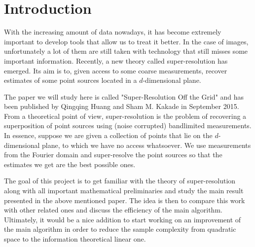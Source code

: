 \chapter{Introduction}
With the increasing amount of data nowadays, it has become extremely important to develop tools that allow us to treat it better. In the case of images, unfortunately a lot of them are still taken with technology that still misses some important information. Recently, a new theory called super-resolution has emerged. Its aim is to, given access to some coarse measurements, recover estimates of some point sources located in a $d$-dimensional plane.\par 

The paper we will study here is called "Super-Resolution Off the Grid" and has been published by Qingqing Huang and Sham M. Kakade in September 2015. From a theoretical point of view, super-resolution is the problem of recovering a superposition of point sources using (noise corrupted) bandlimited measurements. In essence, suppose we are given a collection of points that lie on the $d$-dimensional plane, to which we have no access whatsoever. We use measurements from the Fourier domain and super-resolve the point sources so that the estimates we get are the best possible ones.\par 

The goal of this project is to get familiar with the theory of super-resolution along with all important mathematical preliminaries and study the main result presented in the above mentioned paper. The idea is then to compare this work with other related ones and discuss the efficiency of the main algorithm. Ultimately, it would be a nice addition to start working on an improvement of the main algorithm in order to reduce the sample complexity from quadratic space to the information theoretical linear one.